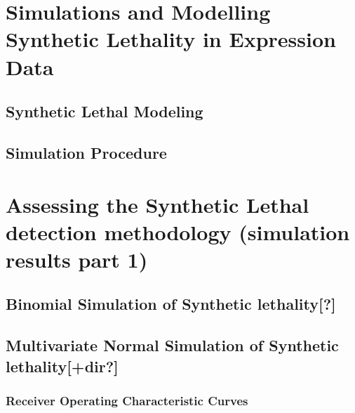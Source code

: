 


\section{Simulations and Modelling Synthetic Lethality in Expression Data}
\subsection{Synthetic Lethal Modeling}
\subsection{Simulation Procedure}
\section{Assessing the Synthetic Lethal detection methodology (simulation results part 1)}
\subsection{Binomial Simulation of Synthetic lethality[?]}
\subsection{Multivariate Normal Simulation of Synthetic lethality[+dir?]}
\subsubsection{Receiver Operating Characteristic Curves}
